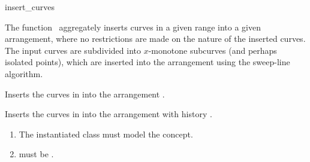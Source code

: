 \ccRefPageBegin

\begin{ccRefFunction}{insert_curves}

\ccDefinition

The function \ccRefName\ aggregately inserts curves in a given range into
a given arrangement, where no restrictions are made on the nature of
the inserted curves.  The input curves are subdivided into
$x$-monotone subcurves (and perhaps isolated points), which are inserted
into the arrangement using the sweep-line algorithm.



Inserts the curves in \ccc{[first,last)} into the arrangement . 




Inserts the curves in \ccc{[first,last)} into the arrangement with
history . 

\begin{enumerate}
\item The instantiated  class must model the
 concept.
\item {} must be .
\end{enumerate}

\end{ccRefFunction}

\ccRefPageEnd
